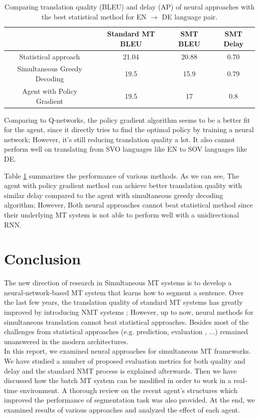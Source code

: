 \documentclass{sfuthesis}
\begin{document}
\begin{table}
\centering
 \begin{tabular}{|c | c | c | c |} 
 \hline
  & Standard MT BLEU & SMT BLEU & SMT Delay \\ [0.5ex] 
 \hline\hline
 Statistical approach & 21.04 & 20.88 & 0.70 \\ 
 \hline
Simultaneous Greedy Decoding & 19.5 & 15.9 & 0.79 \\
 \hline
Agent with Policy Gradient & 19.5 & 17 & 0.8 \\
 \hline
\end{tabular}
\vspace{7mm}
\caption[The best statistical method VS neural approaches for EN $\rightarrow$ DE]{Comparing translation quality (BLEU) and delay (AP) of neural approaches with the best statistical method for EN $\rightarrow$ DE language pair.}
\label{tab:Final}
\end{table}

Comparing to Q-networks, the policy gradient algorithm seems to be a better fit for the agent, since it directly tries to find the optimal policy by training a neural network; However, it's still reducing translation quality a lot. It also cannot perform well on translating from SVO languages like EN to SOV languages like DE. 

Table \ref{tab:Final} summarizes the performance of various methods. As we can see, The agent with policy gradient method can achieve better translation quality with similar delay compared to the agent with simultaneous greedy decoding algorithm; However, Both neural approaches cannot beat statistical method since their underlying MT system is not able to perform well with a unidirectional RNN.

\section{Conclusion}
The new direction of research in Simultaneous MT systems is to develop a neural-network-based MT system that learns how to segment a sentence. Over the last few years, the translation quality of standard MT systems has greatly improved by introducing NMT systems \cite{Sutskever:2014:NIPS}; However, up to now, neural methods for simultaneous translation cannot beat statistical approaches. Besides most of the challenges from statistical approaches (e.g. prediction, evaluation , ...) remained unanswered in the modern architectures.\\
In this report, we examined neural approaches for simultaneous MT frameworks. We have studied a number of proposed evaluation metrics for both quality and delay and the standard NMT process is explained afterwards. Then we have discussed how the batch MT system can be modified in order to work in a real-time environment. A thorough review on the recent agent's structures which improved the performance of segmentation task was also provided. At the end, we examined results of various approaches and analyzed the effect of each agent.
\end{document}
